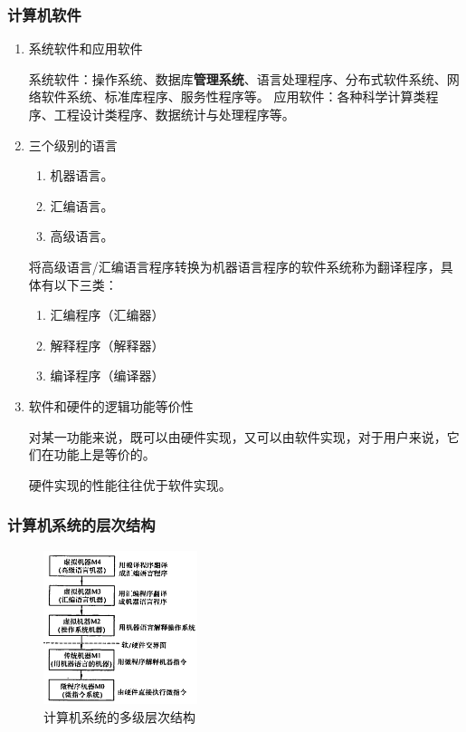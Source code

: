 \documentclass[12pt, a4paper, oneside]{ctexart}
\begin{document}
\subsubsection{计算机软件}

\begin{enumerate}
  \item {\kaishu 系统软件和应用软件}
  
  系统软件：操作系统、数据库\textbf{管理系统}、语言处理程序、分布式软件系统、网络软件系统、标准库程序、服务性程序等。
  应用软件：各种科学计算类程序、工程设计类程序、数据统计与处理程序等。
  \item {\kaishu 三个级别的语言}
  \begin{enumerate}
    \item 机器语言。
    \item 汇编语言。
    \item 高级语言。
  \end{enumerate}
  将高级语言/汇编语言程序转换为机器语言程序的软件系统称为翻译程序，具体有以下三类：
  \begin{enumerate}
    \item 汇编程序（汇编器）
    \item 解释程序（解释器）
    \item 编译程序（编译器）
  \end{enumerate}
  \item {\kaishu 软件和硬件的逻辑功能等价性}

  对某一功能来说，既可以由硬件实现，又可以由软件实现，对于用户来说，它们在功能上是等价的。

  硬件实现的性能往往优于软件实现。
\end{enumerate}

\subsubsection{计算机系统的层次结构}

\begin{figure}[h]
  \centering
  \includegraphics[width=0.4\textwidth]{./images/computer_system_layer.png}
  \caption{计算机系统的多级层次结构}
  \label{computer_system_layer}
\end{figure}
\end{document}
